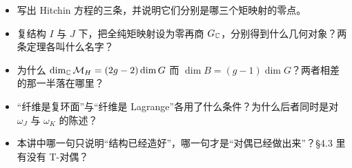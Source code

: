 \begin{checkbox}
\begin{itemize}
\item 写出 Hitchin 方程的三条，并说明它们分别是哪三个矩映射的零点。
\item 复结构 $I$ 与 $J$ 下，把全纯矩映射设为零再商 $G_{\mathbb{C}}$，分别得到什么几何对象？两条定理各叫什么名字？
\item 为什么 $\dim_{\mathbb{C}}\mathcal{M}_{H}=(2g-2)\dim G$ 而 $\dim B=(g-1)\dim G$？两者相差的那一半落在哪里？
\item “纤维是复环面”与“纤维是 Lagrange”各用了什么条件？为什么后者同时是对 $\omega_J$ 与 $\omega_K$ 的陈述？
\item 本讲中哪一句只说明“结构已经造好”，哪一句才是“对偶已经做出来”？§4.3 里有没有 T-对偶？
\end{itemize}
\end{checkbox}
